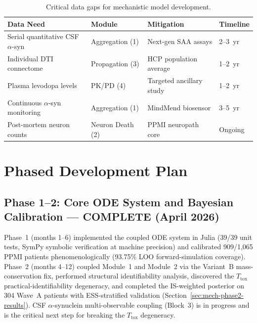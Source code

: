 \begin{table}[h]
\centering
\caption{Critical data gaps for mechanistic model development.}
\label{tab:data-gaps}
\small
\begin{tabular}{p{3cm}p{2.5cm}p{3cm}p{2cm}}
\toprule
\textbf{Data Need} & \textbf{Module} & \textbf{Mitigation} & \textbf{Timeline} \\
\midrule
Serial quantitative CSF $\alpha$-syn & Aggregation (1) & Next-gen SAA assays & 2--3~yr \\
Individual DTI connectome & Propagation (3) & HCP population average & 1--2~yr \\
Plasma levodopa levels & PK/PD (4) & Targeted ancillary study & 1--2~yr \\
Continuous $\alpha$-syn monitoring & Aggregation (1) & MindMend biosensor & 3--5~yr \\
Post-mortem neuron counts & Neuron Death (2) & PPMI neuropath core & Ongoing \\
\bottomrule
\end{tabular}
\end{table}


\section{Phased Development Plan}
\label{sec:mech-phases}

\subsection{Phase 1--2: Core ODE System and Bayesian Calibration --- COMPLETE (April 2026)}

Phase~1 (months 1--6) implemented the coupled ODE system in Julia (39/39 unit tests, SymPy symbolic verification at machine precision) and calibrated 909/1,065 PPMI patients phenomenologically (93.75\% LOO forward-simulation coverage). Phase~2 (months 4--12) coupled Module~1 and Module~2 via the Variant~B mass-conservation fix, performed structural identifiability analysis, discovered the $T_\text{tox}$ practical-identifiability degeneracy, and completed the IS-weighted posterior on 304 Wave~A patients with ESS-stratified validation (Section~\ref{sec:mech-phase2-results}). CSF $\alpha$-synuclein multi-observable coupling (Block~3) is in progress and is the critical next step for breaking the $T_\text{tox}$ degeneracy.

